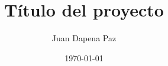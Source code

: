 \documentclass[a4paper,11pt,twoside]{book}
\title{Título del proyecto}
\author{Juan Dapena Paz}
\date{\today}
\begin{document}
	\renewcommand{\listtablename}{Índice de tablas}
	\renewcommand{\tablename}{Tabla}

        

        
        
        
        
        


        \frontmatter

        \tableofcontents
        \listoffigures
        \listoftables

        


        \mainmatter

	
	


        \appendix
%         


	\nocite{*}	%
	
	
	
\end{document}
